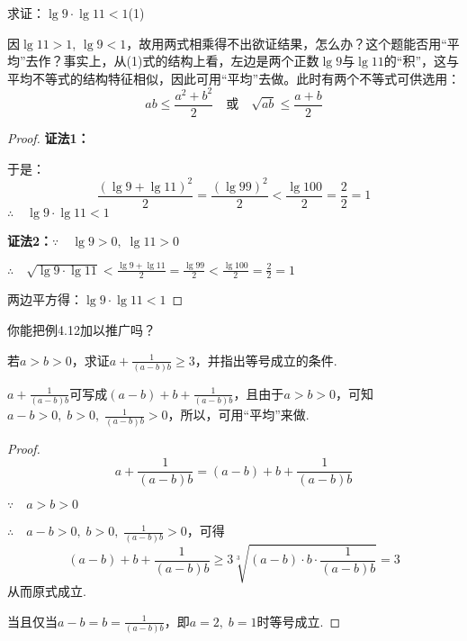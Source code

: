 \begin{example}
    求证：$\lg 9\cdot \lg 11<1$\hfill(1)
\end{example}

\begin{analyze}
因$\lg11>1$, $\lg9<1$，故用两式相乘得不出欲证结果，怎么办？这个题能否用“平均”去作？事实上，从(1)式的结构上看，左边是两个正数$\lg9$与$\lg11$的“积”，这与平均不等式的结构特征相似，因此可用“平均”去做。此时有两个不等式可供选用：
\[ab\le \frac{a^2+b^2}{2}\quad \text{或}\quad \sqrt{ab}\le\frac{a+b}{2}\]
\end{analyze}

\begin{proof}
\textbf{证法1：}
\begin{flushleft}
\end{flushleft}

于是：\[
    \frac{(\lg 9+\lg 11)^2}{2}=\frac{(\lg99)^2}{2}< \frac{\lg 100}{2}=\frac{2}{2}=1
\]
$\therefore\quad \lg 9\cdot \lg 11<1$

\textbf{证法2：}$\because\quad \lg 9>0,\; \lg 11>0$

$\therefore\quad \sqrt{\lg 9\cdot \lg 11}<\frac{\lg 9+\lg11}{2}=\frac{\lg 99}{2}<\frac{\lg 100}{2}=\frac{2}{2}=1$

两边平方得：$\lg 9\cdot \lg 11<1$
\end{proof}

\begin{blk}
你能把例4.12加以推广吗？
\end{blk}

\begin{example}
若$a>b>0$，求证$a+\frac{1}{(a-b)b}\ge 3$，并指出等号成立的条件.
\end{example}

\begin{analyze}
    $a+\frac{1}{(a-b)b}$可写成$(a-b)+b+\frac{1}{(a-b)b}$，且由于$a>b
    >0$，可知$a-b>0,\; b>0,\; \frac{1}{(a-b)b}>0$，所以，可用“平均”来做.
\end{analyze}

\begin{proof}
\[a+\frac{1}{(a-b)b}=(a-b)+b+\frac{1}{(a-b)b}\]

$\because\quad a>b>0$

$\therefore\quad a-b>0,\; b>0,\; \frac{1}{(a-b)b}>0$，可得
\[(a-b)+b+\frac{1}{(a-b)b}\ge 3\sqrt[3]{(a-b)\cdot b\cdot \frac{1}{(a-b)b}}=3\]
从而原式成立. 

当且仅当$a-b=b=\frac{1}{(a-b)b}$，即$a=2,\; b=1$时等号成立.
\end{proof}

